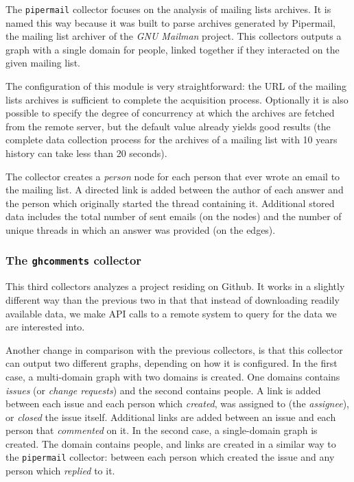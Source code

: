 The \texttt{pipermail} collector focuses on the analysis of mailing lists archives. It is named this way because it was built to parse archives generated by Pipermail, the mailing list archiver of the \emph{GNU Mailman} project. This collectors outputs a graph with a single domain for people, linked together if they interacted on the given mailing list.

The configuration of this module is very straightforward: the URL of the mailing lists archives is sufficient to complete the acquisition process. Optionally it is also possible to specify the degree of concurrency at which the archives are fetched from the remote server, but the default value already yields good results (the complete data collection process for the archives of a mailing list with 10 years history can take less than 20 seconds).

The collector creates a \emph{person} node for each person that ever wrote an email to the mailing list. A directed link is added between the author of each answer and the person which originally started the thread containing it. Additional stored data includes the total number of sent emails (on the nodes) and the number of unique threads in which an answer was provided (on the edges).

\subsubsection{The \texttt{ghcomments} collector}

This third collectors analyzes a project residing on Github. It works in a slightly different way than the previous two in that that instead of downloading readily available data, we make API calls to a remote system to query for the data we are interested into.

Another change in comparison with the previous collectors, is that this collector can output two different graphs, depending on how it is configured. In the first case, a multi-domain graph with two domains is created. One domains contains \emph{issues} (or \emph{change requests}) and the second contains people. A link is added between each issue and each person which \emph{created}, was assigned to (the \emph{assignee}), or \emph{closed} the issue itself. Additional links are added between an issue and each person that \emph{commented} on it. In the second case, a single-domain graph is created. The domain contains people, and links are created in a similar way to the \texttt{pipermail} collector: between each person which created the issue and any person which \emph{replied} to it.

